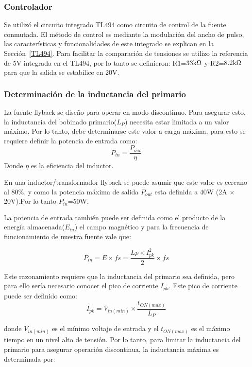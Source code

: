 \subsubsection{Controlador}

Se utilizó el circuito integrado TL494 como circuito de control de la fuente conmutada. El método de control es mediante la modulación del ancho de pulso, las características y funcionalidades de este integrado se explican en la Sección~\ref{TL494}. Para facilitar la comparación de tensiones se utilizo la referencia de 5V integrada en el TL494, por lo tanto se definieron: R1=$33\mbox{k}\Omega $ y R2=$8.2\mbox{k}\Omega$ para que la salida se estabilice en 20V.

\medskip
\subsubsection{Determinación de la inductancia del primario}

La fuente flyback se diseño para operar en modo discontinuo. Para asegurar esto, la 
inductancia del bobinado primario($L_P$) necesita estar limitada a un valor máximo.
Por lo tanto, debe determinarse este valor a carga máxima, para esto se requiere definir la
potencia de entrada como:
$$
P_{in}= \frac{P_{out}}{\eta}
$$
Donde $\eta$ es la eficiencia del inductor.

En una inductor/transformador flyback se puede asumir que este valor es cercano al $80\%$, y como la potencia máxima de salida $P_{out}$ esta definida a 40W (2A $\times$ 20V).Por lo tanto $P_{in}$=50W.

La potencia de entrada también puede ser definida como el producto de la energía almacenada($E_{in}$) el campo magnético y para la frecuencia de funcionamiento de nuestra fuente vale que:

\begin{equation}
P_{in}= E \times fs = \frac{Lp \times I_{pk}^2}{2} \times fs \label{potencia_entrada_L}
\end{equation}

Este razonamiento requiere que la inductancia del primario sea definida, pero para ello sería necesario conocer el pico de corriente $I_{pk}$. Este pico de corriente puede ser definido como:
$$
I_{pk}=V_{in(min)} \times \frac{t_{ON(max)}}{L_P}
$$

donde $V_{in(min)}$ es el mínimo voltaje de entrada y el $t_{ON(max)}$ es el máximo tiempo en un nivel alto de tensión. Por lo tanto, para limitar la inductancia del primario para asegurar operación discontinua, la inductancia máxima es determinada por:

